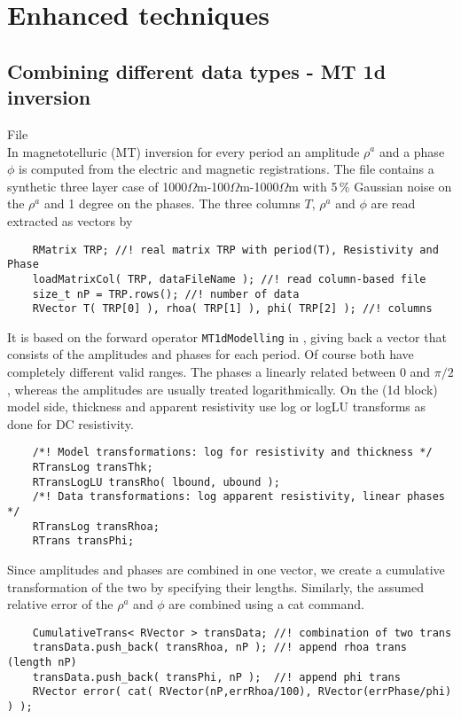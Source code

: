 \section{Enhanced techniques}\label{sec:enhanced}
\subsection{Combining different data types - MT 1d inversion}\label{sec:mt1d}
File \\
In magnetotelluric (MT) inversion for every period an amplitude $\rho^a$ and a phase $\phi$ is computed from the electric and magnetic registrations. The file  contains a synthetic three layer case of 1000$\Omega$m-100$\Omega$m-1000$\Omega$m with 5\,\% Gaussian noise on the $\rho^a$ and 1 degree on the phases.
The three columns $T$, $\rho^a$ and $\phi$ are read extracted as vectors by
\begin{lstlisting}
    RMatrix TRP; //! real matrix TRP with period(T), Resistivity and Phase
    loadMatrixCol( TRP, dataFileName ); //! read column-based file
    size_t nP = TRP.rows(); //! number of data
    RVector T( TRP[0] ), rhoa( TRP[1] ), phi( TRP[2] ); //! columns
\end{lstlisting}
It is based on the forward operator \lstinline|MT1dModelling| in , giving back a vector that consists of the amplitudes and phases for each period. 
Of course both have completely different valid ranges. 
The phases a linearly related between 0 and $\pi/2$, whereas the amplitudes are usually treated logarithmically.
On the (1d block) model side, thickness and apparent resistivity use log or logLU transforms as done for DC resistivity.
\begin{lstlisting}
    /*! Model transformations: log for resistivity and thickness */
    RTransLog transThk;
    RTransLogLU transRho( lbound, ubound );
    /*! Data transformations: log apparent resistivity, linear phases */
    RTransLog transRhoa;
    RTrans transPhi;
\end{lstlisting}
Since amplitudes and phases are combined in one vector, we create a cumulative transformation of the two by specifying their lengths. 
Similarly, the assumed relative error of the $\rho^a$ and $\phi$ are combined using a cat command.
\begin{lstlisting}
    CumulativeTrans< RVector > transData; //! combination of two trans
    transData.push_back( transRhoa, nP ); //! append rhoa trans (length nP)
    transData.push_back( transPhi, nP );  //! append phi trans
    RVector error( cat( RVector(nP,errRhoa/100), RVector(errPhase/phi) ) );
\end{lstlisting}


